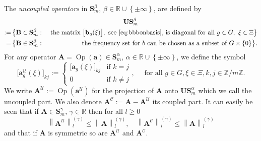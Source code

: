\documentclass[AHL,Unicode,longabstracts,published]{cedram}
\DeclareMathOperator{\Op}{Op}
\newcommand{\R}{\mathbb R}
\newcommand{\Z}{\mathbb Z}
\newcommand{\CC}{\mathcal{C}}
\newcommand{\CU}{\mathcal{U}}
\newcommand{\ba}{\mathbf a}
\newcommand{\BA}{\mathbf A}
\newcommand{\BB}{\mathbf B}
\newcommand{\BS}{\mathbf S}
\newcommand{\BU}{\mathbf U}
\newcommand{\bbb}{\mathbf b}
\newcommand{\set}[1]{\left\{ #1 \right\}}
\newcommand{\snorm}[3]{\left\| #1\right\|_{#3}^{(#2)}}
\begin{document}
\begin{defi}\label{def:uncoupled}
The \emph{uncoupled operators} in $\BS_m^\beta$, $\beta\in\R\cup\set{\pm\infty}$, are defined by
\begin{multline}
\BU\BS_m^\beta\\
\begin{aligned}
:=&\,\big\{\BB\in\BS_m^\beta: \ &\text{the matrix } \big[\bbb_g(\xi)\big], \text{ see~\eqref{eq:bbbonbasis}, is diagonal for all }g\in G,\ \xi\in\Xi\big\}\\
=&\,\big\{\BB\in\BS_m^\beta: \ &\text{the frequency set for }b\text{ can be chosen as a subset of }G\times\{0\}\big\}.
\end{aligned}
\end{multline}
For any operator $\BA =\Op(\ba)\in \BS_m^\alpha$, $\alpha\in\R\cup\set{\pm\infty}$, we define the symbol
\begin{equation}\label{eq:uncoupled}
\big[\ba_g^\CU(\xi)\big]_{k j}:=
\begin{cases}
\big[\ba_g(\xi)\big]_{k j} & \text{if }k =j\\ 0 & \text{if } k\neq j
\end{cases},\quad\text{ for all }g\in G, \xi\in \Xi, k,j\in\Z/m\Z.
\end{equation}
We write $\BA^\CU := \Op(\ba^\CU)$ for the projection of $\BA$ onto $\BU\BS_m^\alpha$ which we call the uncoupled part. We also denote $\BA^{\CC} := \BA - \BA^{\CU}$ its coupled part. It can easily be seen that if $\BA \in
\BS_m^\gamma$, $\gamma \in \R$ then for all $l \ge 0$
\begin{equation}\label{eq:estpartuncbyfull}
\snorm{\BA^\CU}{\gamma}{l} \le \snorm{\BA}{\gamma}{l}, \quad
\snorm{\BA^\CC}{\gamma}{l} \le \snorm{\BA}{\gamma}{l}
\end{equation}
and that if $\BA$ is symmetric so are $\BA^\CU$ and $\BA^\CC$.
\end{defi}
\end{document}
